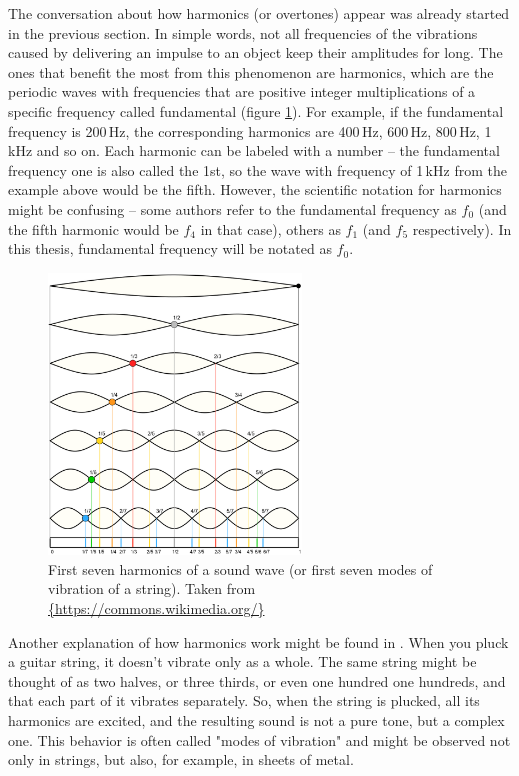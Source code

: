 The conversation about how harmonics (or overtones) appear was already started in the previous section. In simple words, not all frequencies of the vibrations caused by delivering an impulse to an object keep their amplitudes for long. The ones that benefit the most from this phenomenon are harmonics, which are the periodic waves with frequencies that are positive integer multiplications of a specific frequency called fundamental (figure \ref{img:harmonics}). For example, if the fundamental frequency is 200\,Hz, the corresponding harmonics are 400\,Hz, 600\,Hz, 800\,Hz, 1\,kHz and so on. Each harmonic can be labeled with a number -- the fundamental frequency one is also called the 1st, so the wave with frequency of 1\,kHz from the example above would be the fifth. However, the scientific notation for harmonics might be confusing -- some authors refer to the fundamental frequency as $f_0$ (and the fifth harmonic would be $f_4$ in that case), others as $f_1$ (and $f_5$ respectively). In this thesis, fundamental frequency will be notated as $f_0$.\\

\begin{figure}[t]
	\centering
	\includegraphics[width=0.6\textwidth]{include/harmonics}
	\caption[Harmonics of a sound wave]{First seven harmonics of a sound wave (or first seven modes of vibration of a string). Taken from \url{{https://commons.wikimedia.org/}}}
	\label{img:harmonics}
\end{figure}

Another explanation of how harmonics work might be found in \cite{Schnupp2011}. When you pluck a guitar string, it doesn't vibrate only as a whole. The same string might be thought of as two halves, or three thirds, or even one hundred one hundreds, and that each part of it vibrates separately. So, when the string is plucked, all its harmonics are excited, and the resulting sound is not a pure tone, but a complex one. This behavior is often called "modes of vibration" and might be observed not only in strings, but also, for example, in sheets of metal.\\

